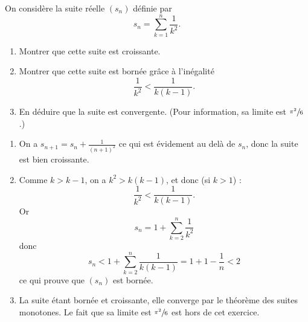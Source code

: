 \documentclass[12pt,french,oneside,a4paper]{memoir} %
\begin{document}
\begin{exo}
  On considère la suite réelle $(s_{n})$ définie par
  \begin{equation*}
    s_{n} = \sum_{k=1}^{n} \frac 1 {k^{2}}.
  \end{equation*}
  \begin{enumerate}
  \item Montrer que cette suite est croissante.
  \item Montrer que cette suite est bornée grâce à l'inégalité
    \begin{equation*}
      \frac 1{k^{2}} < \frac 1{k(k-1)}.
    \end{equation*}
  \item En déduire que la suite est convergente. (Pour information, sa limite est $\sfrac{\pi^{2}}{6}$.)
  \end{enumerate}
  \begin{correction}
    \begin{enumerate}
    \item On a $s_{n+1} = s_{n} + \frac{1}{(n+1)^{2}}$ ce qui est évidement au delà de $s_{n}$, donc la suite est bien croissante.
    \item Comme $k > k-1$, on a $k^{2} > k(k-1)$, et donc (si $k > 1$) :
      \begin{equation*}
        \frac 1{k^{2}} < \frac 1{k(k-1)}.
      \end{equation*}
      Or
      \begin{equation*}
        s_{n}  = 1 + \sum_{k=2}^{n} \frac{1}{k^{2}}
      \end{equation*}
      donc
      \begin{equation*}
        s_{n} < 1 + \sum_{k=2}^{n} \frac{1}{k(k-1)} = 1 + 1 - \frac{1}{n} < 2
      \end{equation*}
      ce qui prouve que $(s_{n})$ est bornée.
    \item La suite étant bornée et croissante, elle converge par le théorème des suites monotones. Le fait que sa limite est $\sfrac{\pi^{2}}{6}$ est hors de cet exercice.
    \end{enumerate}
\end{correction}
\end{exo}
\end{document}
